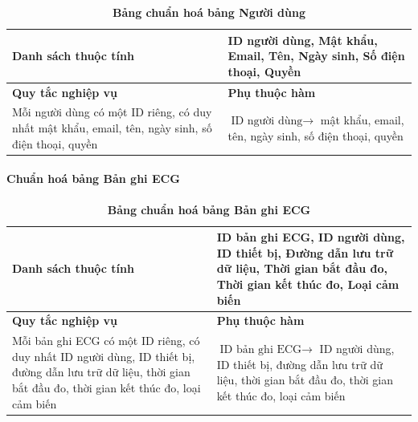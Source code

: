 \begin{table}[H]
  \caption{\bfseries \fontsize{12pt}{0pt}\selectfont Bảng chuẩn hoá bảng Người dùng}
  \centering
  \begin{tabularx}{0.9\textwidth}{|X|X|}
    \hline
    \textbf{Danh sách thuộc tính} & ID người dùng, Mật khẩu, Email, Tên, Ngày sinh, Số điện thoại,
    Quyền \\ %
    \hline
    \textbf{Quy tắc nghiệp vụ} & \textbf{Phụ thuộc hàm} \\
    \hline
    Mỗi người dùng có một ID riêng, có duy nhất mật khẩu, email, tên, ngày sinh, số điện thoại,
    quyền & \parbox[t]{\linewidth}{$\text{ID người dùng} \rightarrow$ mật khẩu, email, tên, ngày sinh, số điện thoại, quyền} \\
    \hline
     \\
     \\
    \hline
  \end{tabularx}
\end{table}


\paragraph{Chuẩn hoá bảng Bản ghi ECG}
\mbox{}

\begin{table}[H]
  \caption{\bfseries \fontsize{12pt}{0pt}\selectfont Bảng chuẩn hoá bảng Bản ghi ECG}
  \centering
  \begin{tabularx}{0.9\textwidth}{|X|X|}
    \hline
    \textbf{Danh sách thuộc tính} & ID bản ghi ECG, ID người dùng, ID thiết bị, Đường dẫn lưu trữ dữ
    liệu, Thời gian bắt đầu đo, Thời gian kết thúc đo, Loại cảm biến \\
    \hline
    \textbf{Quy tắc nghiệp vụ} & \textbf{Phụ thuộc hàm} \\
    \hline
    Mỗi bản ghi ECG có một ID riêng, có duy nhất ID người dùng, ID thiết bị, đường dẫn lưu trữ dữ
    liệu, thời gian bắt đầu đo, thời gian kết thúc đo, loại cảm biến & \parbox[t]{\linewidth}{$ \text{ID bản ghi ECG} \rightarrow$ ID người dùng, ID thiết bị, đường dẫn lưu trữ dữ
    liệu, thời gian bắt đầu đo, thời gian kết thúc đo, loại cảm biến} \\
    \hline
     \\
     \\
    \hline
  \end{tabularx}
\end{table}



